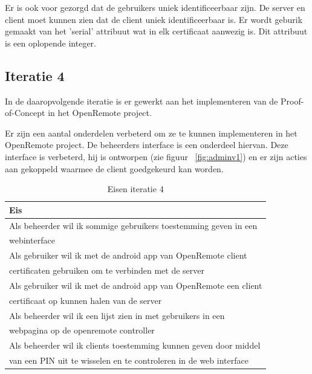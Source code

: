 \documentclass[]{article}
\begin{document}
Er is ook voor gezorgd dat de gebruikers uniek identificeerbaar zijn. De server
en client moet kunnen zien dat de client uniek identificeerbaar is. Er wordt
geburik gemaakt van het 'serial' attribuut wat in elk certificaat aanwezig is.
Dit attribuut is een oplopende integer.

\subsection{Iteratie 4}
In de daaropvolgende iteratie is er gewerkt aan het implementeren van de
Proof-of-Concept in het OpenRemote project.

Er zijn een aantal onderdelen verbeterd om ze te kunnen implementeren in het
OpenRemote project. De beheerders
interface is een onderdeel hiervan. Deze interface is verbeterd, hij is
ontworpen (zie figuur ~\ref{fig:adminv1}) en er zijn acties aan gekoppeld 
waarmee de client goedgekeurd kan worden.

\begin{table}[htpb]
  \caption{Eisen iteratie 4}
  \begin{center}
    \begin{tabular}{|| l ||}\hline
        Eis                                                              \\\hline\hline
        Als beheerder wil ik sommige gebruikers toestemming geven in een \\ 
        webinterface                                                     \\\hline
        Als gebruiker wil ik met de android app van OpenRemote client    \\ 
        certificaten gebruiken om te verbinden met de server             \\\hline
        Als gebruiker wil ik met de android app van OpenRemote een client\\
        certificaat op kunnen halen van de server                        \\\hline
        Als beheerder wil ik een lijst zien in met gebruikers in een     \\ 
        webpagina op de openremote controller                            \\\hline
        Als beheerder wil ik clients toestemming kunnen geven door middel\\ 
        van een PIN uit te wisselen en te controleren in de web interface\\\hline
    \end{tabular}
  \end{center}
\end{table}
\end{document}
